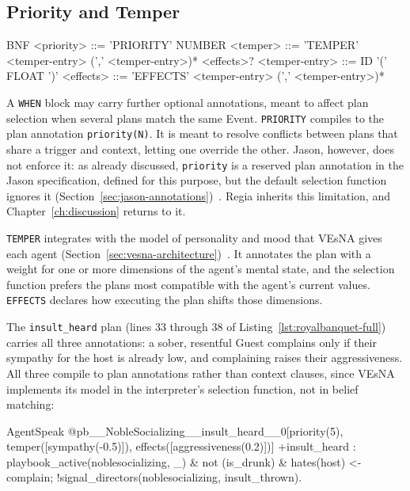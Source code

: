 \subsection{Priority and Temper}
\label{sec:priority-temper}
 
\begin{codeblock}[]{BNF}
    <priority>      ::= 'PRIORITY' NUMBER
    <temper>        ::= 'TEMPER' <temper-entry> (',' <temper-entry>)* <effects>?
    <temper-entry>  ::= ID '(' FLOAT ')'
    <effects>       ::= 'EFFECTS' <temper-entry> (',' <temper-entry>)*
\end{codeblock}
 
A \lstinline|WHEN| block may carry further optional annotations, meant to affect plan selection when several plans match the same Event. \lstinline|PRIORITY| compiles to the plan annotation \lstinline|priority(N)|. It is meant to resolve conflicts between plans that share a trigger and context, letting one override the other. Jason, however, does not enforce it: as already discussed, \lstinline|priority| is a reserved plan annotation in the Jason specification, defined for this purpose, but the default selection function ignores it (Section~\ref{sec:jason-annotations})~\cite{Bordini2007}. Regia inherits this limitation, and Chapter~\ref{ch:discussion} returns to it.
 
\lstinline|TEMPER| integrates with the model of personality and mood that VEsNA gives each agent (Section~\ref{sec:vesna-architecture})~\cite{Gatti2026Pro}. It annotates the plan with a weight for one or more dimensions of the agent's mental state, and the selection function prefers the plans most compatible with the agent's current values. \lstinline|EFFECTS| declares how executing the plan shifts those dimensions.
 
The \lstinline|insult_heard| plan (lines 33 through 38 of Listing~\ref{lst:royalbanquet-full}) carries all three annotations: a sober, resentful Guest complains only if their sympathy for the host is already low, and complaining raises their aggressiveness. All three compile to plan annotations rather than context clauses, since VEsNA implements its model in the interpreter's selection function, not in belief matching:
 
\begin{codeblock}[]{AgentSpeak}
@pb__NobleSocializing__insult_heard__0[priority(5),
    temper([sympathy(-0.5)]), effects([aggressiveness(0.2)])]
+insult_heard : playbook_active(noblesocializing, _)
    & not (is_drunk) & hates(host) <-
    complain;
    !signal_directors(noblesocializing, insult_thrown).
\end{codeblock}
 

